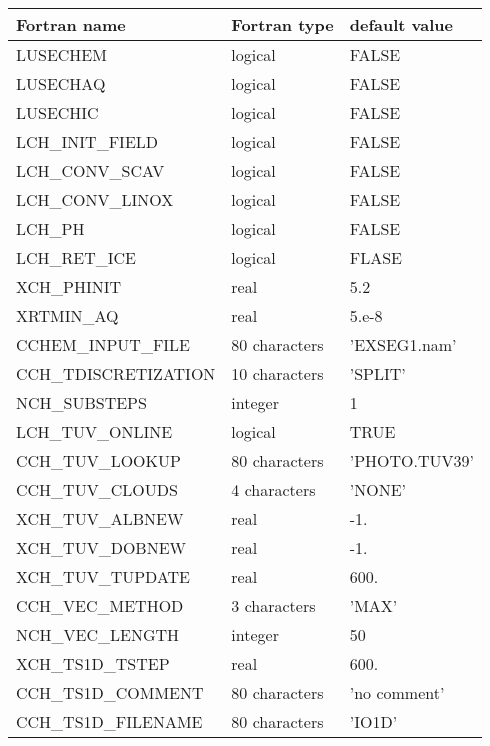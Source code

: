 \begin{longtable} {|p{}|p{}|p{}|}
\hline
Fortran name &  Fortran type & default value \\
\hline 
\endhead
\hline
\endfoot
LUSECHEM                & logical       & FALSE      \\
LUSECHAQ 		&logical 	&FALSE\\
LUSECHIC 		&logical 	&FALSE\\
LCH\_INIT\_FIELD 		&logical 	&FALSE\\
LCH\_CONV\_SCAV 		&logical 	&FALSE\\
LCH\_CONV\_LINOX 		&logical 	&FALSE\\
LCH\_PH			&logical	&FALSE\\
LCH\_RET\_ICE		&logical	&FLASE\\
XCH\_PHINIT		&real		&5.2\\
XRTMIN\_AQ		&real		&5.e-8\\
CCHEM\_INPUT\_FILE 	&80 characters 	&'EXSEG1.nam'\\
CCH\_TDISCRETIZATION 	&10 characters 	&'SPLIT'\\
NCH\_SUBSTEPS 		&integer 	&1\\
LCH\_TUV\_ONLINE 		&logical 	&TRUE\\
CCH\_TUV\_LOOKUP 		&80 characters 	&'PHOTO.TUV39'\\
CCH\_TUV\_CLOUDS 		&4 characters 	&'NONE'\\
XCH\_TUV\_ALBNEW 		&real 		&-1.\\
XCH\_TUV\_DOBNEW 		&real 		&-1.\\
XCH\_TUV\_TUPDATE 	&real 		&600.\\
CCH\_VEC\_METHOD 		&3 characters 	&'MAX'\\
NCH\_VEC\_LENGTH 		&integer 	&50\\
XCH\_TS1D\_TSTEP 		&real 		&600.\\
CCH\_TS1D\_COMMENT 	&80 characters 	&'no comment'\\
CCH\_TS1D\_FILENAME 	&80 characters 	&'IO1D'\\
\end{longtable}

